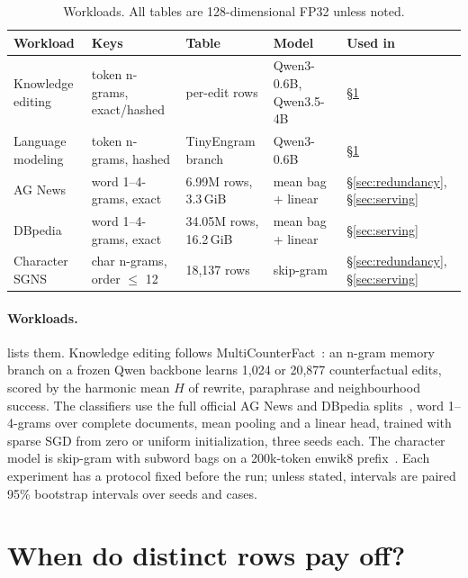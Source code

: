\documentclass[10pt]{article}
\begin{document}
\begin{table}[t]
\centering
\small
\caption{Workloads. All tables are 128-dimensional FP32 unless noted.}
\label{tab:workloads}
\begin{tabular}{@{}lllll@{}}
\toprule
Workload & Keys & Table & Model & Used in \\
\midrule
Knowledge editing & token n-grams, exact/hashed & per-edit rows & Qwen3-0.6B, Qwen3.5-4B~\citep{qwen3} & \S\ref{sec:identity} \\
Language modeling & token n-grams, hashed & TinyEngram branch~\citep{tinyengram} & Qwen3-0.6B & \S\ref{sec:identity} \\
AG News & word 1--4-grams, exact & 6.99M rows, 3.3\,GiB & mean bag + linear & \S\ref{sec:redundancy}, \S\ref{sec:serving} \\
DBpedia & word 1--4-grams, exact & 34.05M rows, 16.2\,GiB & mean bag + linear & \S\ref{sec:serving} \\
Character SGNS & char n-grams, order $\le$ 12 & 18,137 rows & skip-gram~\citep{mikolov2013distributed} & \S\ref{sec:redundancy}, \S\ref{sec:serving} \\
\bottomrule
\end{tabular}
\end{table}

\paragraph{Workloads.}  lists them. Knowledge editing follows MultiCounterFact~\citep{meng2023memit}: an n-gram memory branch on a frozen Qwen backbone learns 1,024 or 20,877 counterfactual edits, scored by the harmonic mean $H$ of rewrite, paraphrase and neighbourhood success. The classifiers use the full official AG News and DBpedia splits~\citep{zhang2015character}, word 1--4-grams over complete documents, mean pooling and a linear head, trained with sparse SGD from zero or uniform initialization, three seeds each. The character model is skip-gram with subword bags on a 200k-token enwik8 prefix~\citep{mahoney2011enwik8}. Each experiment has a protocol fixed before the run; unless stated, intervals are paired 95\% bootstrap intervals over seeds and cases.

\section{When do distinct rows pay off?}
\label{sec:identity}
\end{document}
